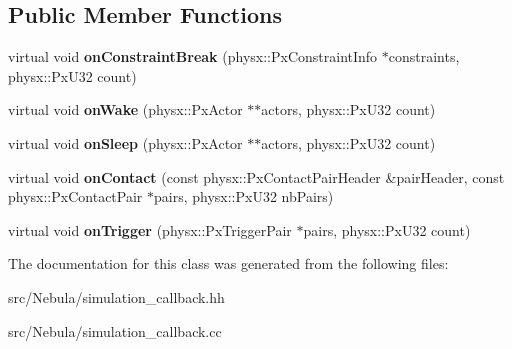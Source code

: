 \subsection*{Public Member Functions}
\begin{DoxyCompactItemize}
\item 
\hypertarget{classNeb_1_1simulation__callback_a19793cdc33472be18f7839fb2d7fea97}{virtual void {\bfseries on\-Constraint\-Break} (physx\-::\-Px\-Constraint\-Info $\ast$constraints, physx\-::\-Px\-U32 count)}\label{classNeb_1_1simulation__callback_a19793cdc33472be18f7839fb2d7fea97}

\item 
\hypertarget{classNeb_1_1simulation__callback_ae3c155b2b77603562be48c4e67fa8026}{virtual void {\bfseries on\-Wake} (physx\-::\-Px\-Actor $\ast$$\ast$actors, physx\-::\-Px\-U32 count)}\label{classNeb_1_1simulation__callback_ae3c155b2b77603562be48c4e67fa8026}

\item 
\hypertarget{classNeb_1_1simulation__callback_ab5f0852a4102fc6adf5a981803b11fc9}{virtual void {\bfseries on\-Sleep} (physx\-::\-Px\-Actor $\ast$$\ast$actors, physx\-::\-Px\-U32 count)}\label{classNeb_1_1simulation__callback_ab5f0852a4102fc6adf5a981803b11fc9}

\item 
\hypertarget{classNeb_1_1simulation__callback_a81d02ce1df83fbec396560c9f250e9a1}{virtual void {\bfseries on\-Contact} (const physx\-::\-Px\-Contact\-Pair\-Header \&pair\-Header, const physx\-::\-Px\-Contact\-Pair $\ast$pairs, physx\-::\-Px\-U32 nb\-Pairs)}\label{classNeb_1_1simulation__callback_a81d02ce1df83fbec396560c9f250e9a1}

\item 
\hypertarget{classNeb_1_1simulation__callback_a380b0166d2a5313df0a257960f069672}{virtual void {\bfseries on\-Trigger} (physx\-::\-Px\-Trigger\-Pair $\ast$pairs, physx\-::\-Px\-U32 count)}\label{classNeb_1_1simulation__callback_a380b0166d2a5313df0a257960f069672}

\end{DoxyCompactItemize}


The documentation for this class was generated from the following files\-:\begin{DoxyCompactItemize}
\item 
src/\-Nebula/simulation\-\_\-callback.\-hh\item 
src/\-Nebula/simulation\-\_\-callback.\-cc\end{DoxyCompactItemize}
